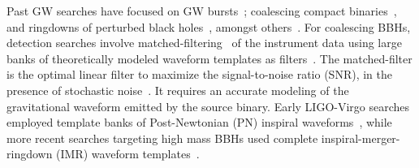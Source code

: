 \documentclass[aps,
prd,
twocolumn,
superscriptaddress,
lengthcheck,showpacs,letterpaper,nofootinbib,
floatfix]{revtex4-1}
\begin{document}
Past GW searches  have focused on GW bursts~\cite{Abadie:2010mt,
Abadie:2010wx,Abadie:2012rq}; coalescing compact
binaries~\cite{Colaboration:2011nz,Abadie:2010yb,Abbott:2009qj,
Abbott:2009tt,Messaritaki:2005wv,Abadie:2011kd,Aasi:2012rja},
and ringdowns of perturbed black holes~\cite{Abbott:2009km}, amongst
others~\cite{Abbott:2003yq,Abbott:2005pu,Sintes:2005fp,Abadie:2011md,
Palomba:2012wn}. For coalescing BBHs, detection searches involve 
matched-filtering~\cite{Wainstein:1962,Allen:2005fk} of the instrument
data using large banks of theoretically modeled waveform templates
as filters~\cite{Sathyaprakash:1991mt,SathyaMetric2PN,OwenTemplateSpacing,
BabaketalBankPlacement,SathyaBankPlacementTauN,Cokelaer:2007kx}.
The matched-filter is the optimal linear filter to maximize the
signal-to-noise ratio (SNR), in the presence of stochastic 
noise~\cite{1057571}. It requires an accurate modeling of the gravitational 
waveform emitted by the source binary. Early LIGO-Virgo searches 
employed template banks of Post-Newtonian (PN) inspiral 
waveforms~\cite{Colaboration:2011nz,Abadie:2010yb,Abbott:2009qj,
Abbott:2009tt,Messaritaki:2005wv}, while more recent
searches targeting high mass BBHs used complete inspiral-merger-ringdown
(IMR) waveform templates~\cite{Abadie:2011kd,Aasi:2012rja}. 

\end{document}
